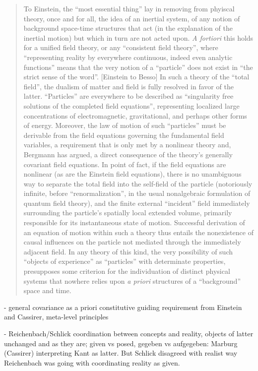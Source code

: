 \begin{quote}
    To Einstein, the ``most essential thing'' lay in removing from phyiscal theory, once and for all, the idea of an inertial system, of any notion of background space-time structures that act (in the explanation of the inertial motion) but which in turn are not acted upon.  \emph{A fortiori} this holds for a unified field theory, or any ``consistent field theory'', where ``representing reality by everywhere continuous, indeed even analytic functions'' means that the very notion of a ``particle'' does not exist in ``the strict sense of the word''.  [Einstein to Besso]  In such a theory of the ``total field'', the dualism of matter and field is fully resolved in favor of the latter.  ``Particles'' are everywhere to be described as ``singularity free solutions of the completed field equations'', representing localized large concentrations of electromagnetic, gravitational, and perhaps other forms of energy.  Moreover, the law of motion of such ``particles'' must be derivable from the field equations governing the fundamental field variables, a requirement that is only met by a nonlinear theory and, Bergmann has argued, a direct consequence of the theory's generally covariant field equations.  In point of fact, if the field equations are nonlinear (as are the Einstein field equations), there is no unambiguous way to separate the total field into the self-field of the particle (notoriously infinite, before ``renormalization'', in the usual nonalgebraic formulation of quantum field theory), and the finite external ``incident'' field immediately surrounding the particle's spatially local extended volume, primarily responsible for its instantaneous state of motion.  Successful derivation of an equation of motion within such a theory thus entails the nonexistence of causal influences on the particle not mediated through the immediately adjacent field.  In any theory of this kind, the very possibility of such ``objects of experience'' as ``particles'' with determinate properties, presupposes some criterion for the individuation of distinct physical systems that nowhere relies upon \emph{a priori} structures of a ``background'' space and time.  
    
    \citep[p. 23-24]{Ryckman2005}
\end{quote}

- general covariance as a priori constitutive guiding requirement from Einstein and Cassirer, meta-level principles

- Reichenbach/Schlick coordination between concepts and reality, objects of latter unchanged and as they are; given vs posed, gegeben vs aufgegeben: Marburg (Cassirer) interpreting Kant as latter.  But Schlick disagreed with realist way Reichenbach was going with coordinating reality as given.

